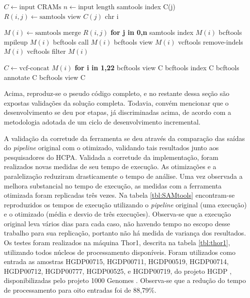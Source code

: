 \documentclass[cic,tc]{iiufrgs}
\begin{document}
\begin{algorithmic}
  \State $C \gets \text{input CRAMs}$
  \State $n \gets \text{input length}$
  \State samtools index C(j)
    \State $R(i,j) \gets \text{samtools view } C(j) \text{ chr i}$
  \EndFor
\EndFor

  \State $M(i) \gets \text{samtools merge } R(i,j)$ \textbf{for j in 0,n}
  \State samtools index $M(i)$
  \State bcftools mpileup $M(i)$
  \State bcftools call $M(i)$
  \State bcftools view $M(i)$
  \State vcftools remove-indels $M(i)$
  \State vcftools filter $M(i)$
\EndFor

\State $C \gets \text{vcf-concat } M(i)$ \textbf{for i in 1,22}
\State bcftools view C
\State bcftools index C
\State bcftools annotate C
\State bcftools view C
\end{algorithmic}

Acima, reproduz-se o pseudo código completo, e no restante dessa seção são
expostas validações da solução completa. Todavia, convém mencionar que o
desenvolvimento se deu por etapas, já discriminadas acima, de acordo com a
metodologia adotada de um ciclo de desenvolvimento incremental.

A validação da corretude da ferramenta se deu através da comparação das saídas
do \textit{pipeline} original com o otimizado, validando tais resultados junto
aos pesquisadores do HCPA. Validada a corretude da implementação, foram
realizados novas medidas de seu tempo de execução. As otimizações e a
paralelização reduziram drasticamente o tempo de análise. Uma vez observada a
melhora substancial no tempo de execução, as medidas com a ferramenta otimizada
foram replicadas três vezes. Na tabela \ref{tbl:SAMtools} encontram-se
reproduzidos os tempos de execução utilizando o \textit{pipeline} original (uma
execução) e o otimizado (média e desvio de três execuções). Observa-se que a
execução original leva vários dias para cada caso, não havendo tempo no escopo
desse trabalho para sua replicação, portanto não há medida de variança dos
resultados. Os testes foram realizados na máquina Thor1, descrita na tabela
\ref{tbl:thor1}, utilizando todos núcleos de processamento disponíveis.  Foram
utilizados como entrada as amostras HGDP00715, HGDP00711, HGDP00519, HGDP00714,
HGDP00712, HGDP00777, HGDP00525, e HGDP00719, do projeto HGDP
\cite{cavalli2005human}, disponibilizadas pelo projeto 1000 Genomes
\cite{via20101000}. Observa-se que a redução do tempo de processamento para
oito entradas foi de 88,79\%.
\end{document}
